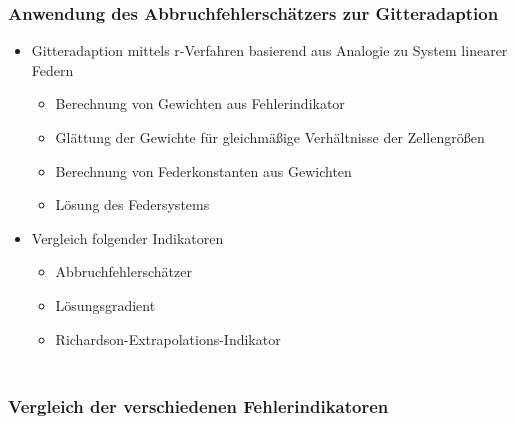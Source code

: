 \documentclass[accentcolor=tud2c,colorbacktitle,inverttitle,landscape,ngerman,presentation,t]{tudbeamer}
\begin{document}
\begin{frame}
  \frametitle{Anwendung des Abbruchfehlerschätzers zur Gitteradaption}
    \begin{itemize}
      \item Gitteradaption mittels r-Verfahren basierend aus Analogie zu System
        linearer Federn
        \begin{itemize}
          \item Berechnung von Gewichten aus Fehlerindikator
          \item Glättung der Gewichte für gleichmäßige Verhältnisse der Zellengrößen
          \item Berechnung von Federkonstanten aus Gewichten
          \item Lösung des Federsystems
        \end{itemize}
      \item Vergleich folgender Indikatoren
        \begin{itemize}
          \item Abbruchfehlerschätzer
          \item Lösungsgradient
          \item Richardson-Extrapolations-Indikator
        \end{itemize}
    \end{itemize}
\end{frame}


\begin{frame}
  \frametitle{\\Vergleich der verschiedenen Fehlerindikatoren}
  \begin{figure}[h]
\centering
{}
\label{fig:it_all}
\end{figure}
\end{frame}
\end{document}
